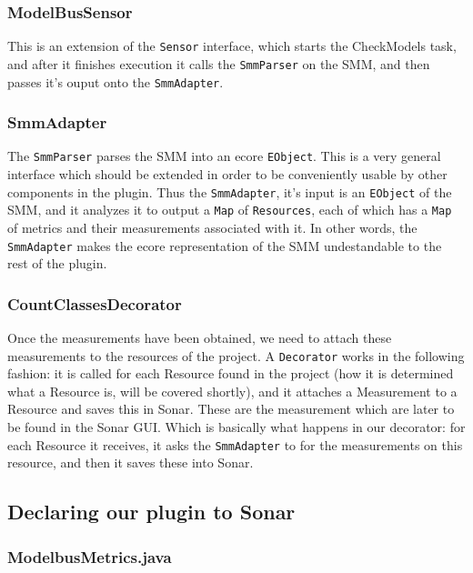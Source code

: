 \subsubsection{ModelBusSensor}

This is an extension of the \texttt{Sensor} interface, which
starts the CheckModels task, and after it finishes execution
it calls the \texttt{SmmParser} on the SMM, and then passes
it's ouput onto the \texttt{SmmAdapter}.

\subsubsection{SmmAdapter}

The \texttt{SmmParser} parses the SMM into an ecore \texttt{EObject}.
This is a very general interface which should be extended in order
to be conveniently usable by other components in the plugin.
Thus the \texttt{SmmAdapter}, it's input is an \texttt{EObject}
of the SMM, and it analyzes it to output a \texttt{Map} of \texttt{Resources},
each of which has a \texttt{Map} of metrics and their measurements
associated with it. In other words, the \texttt{SmmAdapter} makes
the ecore representation of the SMM undestandable to the rest
of the plugin.

\subsubsection{CountClassesDecorator}

Once the measurements have been obtained, we need to attach these
measurements to the resources of the project. A \texttt{Decorator}
works in the following fashion: it is called for each Resource
found in the project (how it is determined what a Resource is, will
be covered shortly), and it attaches a Measurement to a Resource
and saves this in Sonar. These are the measurement which are later
to be found in the Sonar GUI. Which is basically what happens in
our decorator: for each Resource it receives, it asks the \texttt{SmmAdapter}
to for the measurements on this resource, and then it saves these
into Sonar.

\subsection{Declaring our plugin to Sonar}

\subsubsection{ModelbusMetrics.java}

